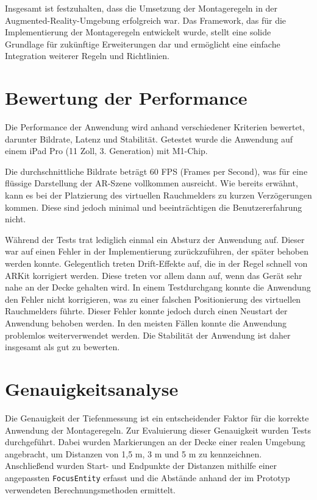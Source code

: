 Insgesamt ist festzuhalten, dass die Umsetzung der Montageregeln in der Augmented-Reality-Umgebung erfolgreich war. Das Framework, das für die Implementierung der Montageregeln entwickelt wurde, stellt eine solide Grundlage für zukünftige Erweiterungen dar und ermöglicht eine einfache Integration weiterer Regeln und Richtlinien.

\section{Bewertung der Performance}

Die Performance der Anwendung wird anhand verschiedener Kriterien bewertet, darunter Bildrate, Latenz und Stabilität. Getestet wurde die Anwendung auf einem iPad Pro (11 Zoll, 3. Generation) mit M1-Chip.

Die durchschnittliche Bildrate beträgt 60 FPS (Frames per Second), was für eine flüssige Darstellung der AR-Szene vollkommen ausreicht. Wie bereits erwähnt, kann es bei der Platzierung des virtuellen Rauchmelders zu kurzen Verzögerungen kommen. Diese sind jedoch minimal und beeinträchtigen die Benutzererfahrung nicht. 

Während der Tests trat lediglich einmal ein Absturz der Anwendung auf. Dieser war auf einen Fehler in der Implementierung zurückzuführen, der später behoben werden konnte. Gelegentlich treten Drift-Effekte auf, die in der Regel schnell von ARKit korrigiert werden. Diese treten vor allem dann auf, wenn das Gerät sehr nahe an der Decke gehalten wird. In einem Testdurchgang konnte die Anwendung den Fehler nicht korrigieren, was zu einer falschen Positionierung des virtuellen Rauchmelders führte. Dieser Fehler konnte jedoch durch einen Neustart der Anwendung behoben werden. In den meisten Fällen konnte die Anwendung problemlos weiterverwendet werden. Die Stabilität der Anwendung ist daher insgesamt als gut zu bewerten. 

\section{Genauigkeitsanalyse}

Die Genauigkeit der Tiefenmessung ist ein entscheidender Faktor für die korrekte Anwendung der Montageregeln. Zur Evaluierung dieser Genauigkeit wurden Tests durchgeführt. Dabei wurden Markierungen an der Decke einer realen Umgebung angebracht, um Distanzen von 1,5 m, 3 m und 5 m zu kennzeichnen. Anschließend wurden Start- und Endpunkte der Distanzen mithilfe einer angepassten \texttt{FocusEntity} erfasst und die Abstände anhand der im Prototyp verwendeten Berechnungsmethoden ermittelt.

